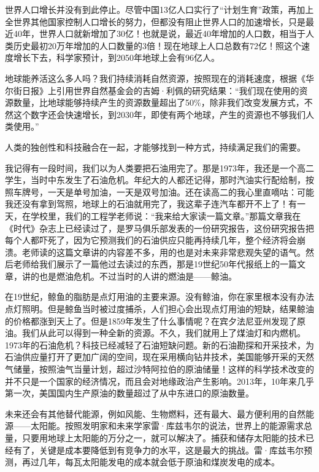世界人口增长并没有到此停止。尽管中国13亿人口实行了“计划生育”政策，再加上全世界其他国家控制人口增长的努力，但都没有阻止世界人口的加速增长，只是最近40年，世界人口就新增加了30亿！也就是说，最近40年增加的人口数，相当于人类历史最初20万年增加的人口数量的3倍！现在地球上人口总数有72亿！照这个速度增长下去，科学家预计，到2050年地球上会有96亿人。

地球能养活这么多人吗？我们持续消耗自然资源，按照现在的消耗速度，根据《华尔街日报》上引用世界自然基金会的吉姆·利佩的研究结果：“我们现在使用的资源数量，比地球能够持续产生的资源数量超出了50\%，除非我们改变发展方式，不然这个数字还会快速增长，到2030年，即使有两个地球，产生的资源也不够我们人类使用。”

人类的独创性和科技融合在一起，才能够找到一种方式，持续满足我们的需要。

我记得有一段时间，我们以为人类要把石油用完了。那是1973年，我还是一个高二学生，当时中东发生了石油危机。年纪大的人都还记得，那时汽油实行配给制，按照车牌号，一天是单号加油，一天是双号加油。还在读高二的我心里直嘀咕：可能我还没有拿到驾照，地球上的石油就用完了，我这辈子连汽车都开不上了！有一天，在学校里，我们的工程学老师说：“我来给大家读一篇文章。”那篇文章我在《时代》杂志上已经读过了，是罗马俱乐部发表的一份研究报告，这份研究报告把每个人都吓死了，因为它预测我们的石油供应只能再持续几年，整个经济将会崩溃。老师读的这篇文章讲的内容差不多，用的也是对未来非常悲观失望的语气。然后老师给我们展示了一篇他过去读过的东西，那是19世纪50年代报纸上的一篇文章，讲的也是燃油危机。不过当时的人讲的燃油是——鲸油。

在19世纪，鲸鱼的脂肪是点灯用油的主要来源。没有鲸油，你在家里根本没有办法点灯照明。但是鲸鱼当时被过度捕杀，人们担心会出现点灯用油的短缺，结果鲸油的价格都涨到天上了。但是1859年发生了什么事情呢？在宾夕法尼亚州发现了原油。我们从此可以得到一种全新的资源。不久，我们就用上了煤油灯和内燃机。1973年的石油危机？科技已经减轻了石油短缺问题。新的石油勘探和开采技术，为石油供应量打开了更加广阔的空间，现在采用横向钻井技术，美国能够开采的天然气储量，按照油气当量计划，超过沙特阿拉伯的原油储量！这样的科学技术改变的并不只是一个国家的经济情况，而且会对地缘政治产生影响。2013年，10年来几乎第一次，美国国内生产原油的数量超过了从中东进口的原油数量。

未来还会有其他替代能源，例如风能、生物燃料，还有最大、最方便利用的自然能源——太阳能。按照发明家和未来学家雷·库兹韦尔的说法，世界上的能源需求总量，只要用地球上太阳能的万分之一，就可以解决了。捕获和储存太阳能的技术已经有了，关键是成本要降低到有竞争力的水平，这是最大的挑战。雷·库兹韦尔预测，再过几年，每瓦太阳能发电的成本就会低于原油和煤炭发电的成本。

